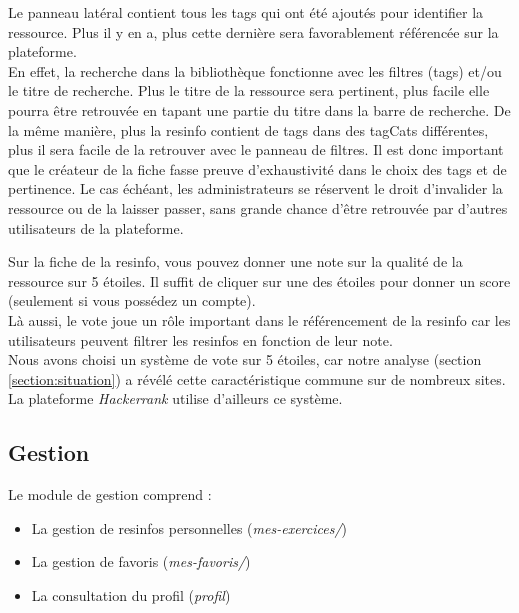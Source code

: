
Le panneau latéral contient tous les \glspl{tag} qui ont été ajoutés pour identifier la ressource. Plus il y en a, plus cette dernière sera favorablement référencée sur la plateforme.\\

En effet, la recherche dans la bibliothèque fonctionne avec les filtres (\glspl{tag}) et/ou le titre de recherche. Plus le titre de la ressource sera pertinent, plus facile elle pourra être retrouvée en tapant une partie du titre dans la barre de recherche. 
De la même manière, plus la \gls{resinfo} contient de \glspl{tag} dans des \glspl{tagCat} différentes, plus il sera facile de la retrouver avec le panneau de filtres. Il est donc important que le créateur de la \gls{fiche} fasse preuve d'exhaustivité dans le choix des \glspl{tag} et de pertinence. Le cas échéant, les administrateurs se réservent le droit d'invalider la ressource ou de la laisser passer, sans grande chance d'être retrouvée par d'autres utilisateurs de la plateforme.

\label{section:systemeDeVote}

Sur la \gls{fiche} de la \gls{resinfo}, vous pouvez donner une note sur la qualité de la ressource sur 5 étoiles. Il suffit de cliquer sur une des étoiles pour donner un score (seulement si vous possédez un compte).\\

Là aussi, le vote joue un rôle important dans le référencement de la \gls{resinfo} car les utilisateurs peuvent filtrer les \glspl{resinfo} en fonction de leur note.\\

Nous avons choisi un système de vote sur 5 étoiles, car notre analyse (section \ref{section:situation}) a révélé cette caractéristique commune sur de nombreux sites. La plateforme \textit{Hackerrank} utilise d'ailleurs ce système.


\subsection{Gestion}

Le module de gestion comprend :

\begin{itemize}
    \item La gestion de \glspl{resinfo} personnelles (\textit{mes-exercices/})
    \item La gestion de favoris (\textit{mes-favoris/})
    \item La consultation du profil (\textit{profil})
\end{itemize}

